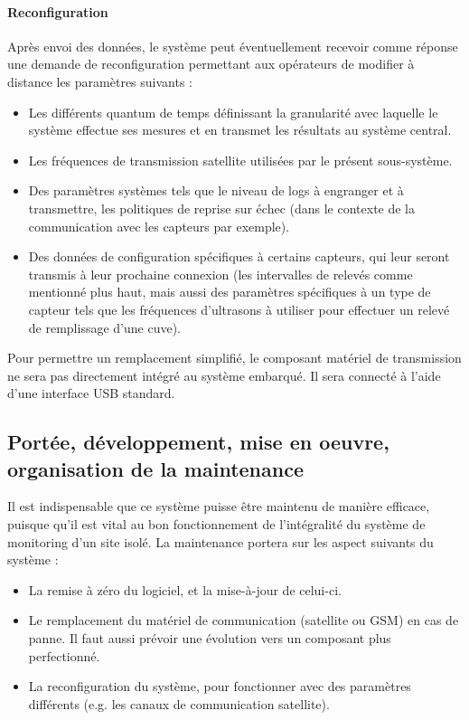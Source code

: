 \paragraph{Reconfiguration} Après envoi des données, le système peut éventuellement recevoir comme réponse une demande de reconfiguration permettant aux opérateurs de modifier à distance les paramètres suivants :

\begin{itemize}
\item Les différents quantum de temps définissant la granularité avec laquelle le système effectue ses mesures et en transmet les résultats au système central.
\item Les fréquences de transmission satellite utilisées par le présent sous-système.
\item Des paramètres systèmes tels que le niveau de logs à engranger et à transmettre, les politiques de reprise sur échec (dans le contexte de la communication avec les capteurs par exemple).
\item Des données de configuration spécifiques à certains capteurs, qui leur seront transmis à leur prochaine connexion (les intervalles de relevés comme mentionné plus haut, mais aussi des paramètres spécifiques à un type de capteur tels que les fréquences d'ultrasons à utiliser pour effectuer un relevé de remplissage d'une cuve).
\end{itemize}

Pour permettre un remplacement simplifié, le composant matériel de transmission ne sera pas directement intégré au système embarqué. Il sera connecté à l'aide d'une interface USB standard.

\subsection{Portée, développement, mise en oeuvre, organisation de la maintenance}

Il est indispensable que ce système puisse être maintenu de manière efficace, puisque qu'il est vital au bon fonctionnement de l'intégralité du système de monitoring d'un site isolé. La maintenance portera sur les aspect suivants du système :

\begin{itemize}
\item La remise à zéro du logiciel, et la mise-à-jour de celui-ci.
\item Le remplacement du matériel de communication (satellite ou GSM) en cas de panne. Il faut aussi prévoir une évolution vers un composant plus perfectionné.\footnotemark
\item La reconfiguration du système, pour fonctionner avec des paramètres différents (e.g. les canaux de communication satellite).
\end{itemize}

